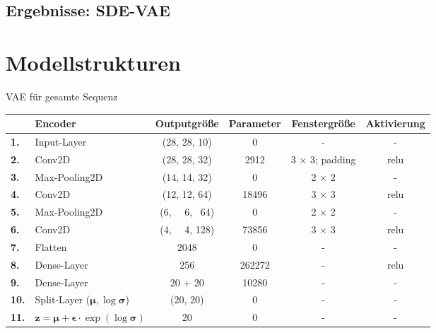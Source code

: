 \documentclass[12pt]{article}
\begin{document}
	\subsection[SDE-VAE]{Ergebnisse: SDE-VAE}
	\newpage
	\section[Modellstrukturen]{Modellstrukturen}
	VAE für gesamte Sequenz

	\begin{table}[htb]
		\begin{center}
			\begin{tabular}{llcccc}\toprule
				\textbf{\ }	&\textbf{Encoder}	&\textbf{Outputgröße} &\textbf{Parameter} &\textbf{Fenstergröße} &\textbf{Aktivierung}\\
				\midrule
				\textbf{1.}	&Input-Layer	& (28, 28, 10)		& 0		& - 			&- \\
				\textbf{2.}	&Conv2D 		& (28, 28, 32)		& 2912	& 3 $\times$ 3; padding	&relu \\
				\textbf{3.}	&Max-Pooling2D	& (14, 14, 32)		& 0		& 2 $\times$ 2	&- \\
				\textbf{4.}	&Conv2D			& (12, 12, 64)		& 18496	& 3 $\times$ 3	&relu \\
				\textbf{5.}	&Max-Pooling2D	& (6, \ \ 6, \ 64)	& 0		& 2 $\times$ 2 	&- \\
				\textbf{6.}	&Conv2D		& (4, \ \ 4,  128)	& 73856	& 3 $\times$ 3 	&relu \\
				\textbf{7.}	&Flatten		& 2048				& 0		& - 			&- \\
				\textbf{8.}	&Dense-Layer			& 256				& 262272	& - 			&relu \\
				\textbf{9.}	&Dense-Layer 			& 20 + 20				& 10280	& - 			&- \\
				\textbf{10.}	&Split-Layer	($\boldsymbol{\mu}, \log\boldsymbol{\sigma}$)	& (20, 20)				& 0	& - 			&- \\
				\textbf{11.}&$\mathbf{z}=\boldsymbol{\mu}+\boldsymbol{\epsilon}\cdot\exp(\log\boldsymbol{\sigma})$		& 20				& 0	& - 			&-\\
				\bottomrule
			\end{tabular}
		\end{center}
	\end{table}
\end{document}
